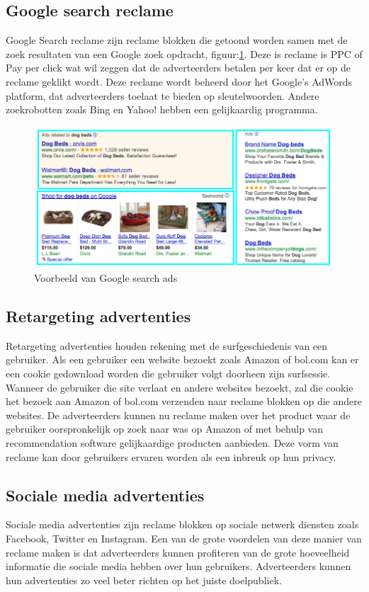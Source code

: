\documentclass[pdftex,a4paper,12pt,twoside]{report}
\begin{document}
\subsection{Google search reclame }
\label{sec Google search reclame }
Google Search reclame zijn reclame blokken die getoond worden samen met de zoek resultaten van een Google zoek opdracht, figuur:\ref{fig: Google-Search-ad}. Deze is reclame is PPC of Pay per click wat wil zeggen dat de adverteerders betalen per keer dat er op de reclame geklikt wordt. Deze reclame wordt beheerd door het Google’s AdWords platform, dat adverteerders toelaat te bieden op sleutelwoorden. Andere zoekrobotten zoals Bing en Yahoo! hebben een gelijkaardig programma.
\begin{figure}[h!]
\centering
\includegraphics[width=12cm]{img/example-of-google-ads}
\caption{Voorbeeld van Google search ads}
\label{fig: Google-Search-ad}
\end{figure}
\subsection{Retargeting advertenties }
\label{sec Retargeting advertenties }
Retargeting advertenties houden rekening met de surfgeschiedenis van een gebruiker. Als een gebruiker een website bezoekt zoals Amazon of bol.com kan er een cookie gedownload worden die gebruiker volgt doorheen zijn surfsessie. Wanneer de gebruiker die site verlaat en andere websites bezoekt, zal die cookie het bezoek aan Amazon of bol.com verzenden naar reclame blokken op die andere websites. De adverteerders kunnen nu reclame maken over het product waar de gebruiker oorspronkelijk op zoek naar was op Amazon of met behulp van recommendation software gelijkaardige producten aanbieden. Deze vorm van reclame kan door gebruikers ervaren worden als een inbreuk op hun privacy.
\subsection{Sociale media advertenties }
\label{sec Sociale media advertenties }
Sociale media advertenties zijn reclame blokken op sociale netwerk diensten zoals Facebook, Twitter en Instagram. Een van de grote voordelen van deze manier van reclame maken is dat adverteerders kunnen profiteren van de grote hoeveelheid informatie die sociale media hebben over hun gebruikers. Adverteerders kunnen hun advertenties zo veel beter richten op het juiste doelpubliek.
\end{document}
